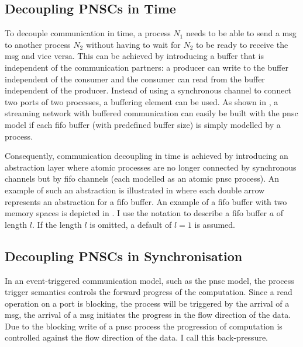 \subsection{Decoupling PNSCs in Time}
\label{sect_cci_decoupling_time}
To decouple communication in time, a process $N_1$ needs to be able to send a \gls*{msg} to another process $N_2$ without having to wait for $N_2$ to be ready to receive the \gls*{msg} and vice versa.
This can be achieved by introducing a buffer that is independent of the communication partners: a producer can write to the buffer independent of the consumer and the consumer can read from the buffer independent of the producer.
Instead of using a synchronous channel to connect two ports of two processes, a buffering element can be used.
As shown in \Sect{\ref{sect_ecm_example_stream}}, a streaming network with buffered communication can easily be built with the \gls{pnsc} model if each \gls{fifo} buffer (with predefined buffer size) is simply modelled by a process.

Consequently, communication decoupling in time is achieved by introducing an abstraction layer where atomic processes are no longer connected by synchronous channels but by \gls{fifo} channels (each modelled as an atomic \gls{pnsc} process).
An example of such an abstraction is illustrated in \Fig{\ref{fig_cross_procs_dl}} where each double arrow represents an abstraction for a \gls{fifo} buffer.
An example of a \gls{fifo} buffer with two memory spaces is depicted in \Fig{\ref{fig_sia_fifo}}.
I use the notation  to describe a \gls{fifo} buffer $a$ of length $l$.
If the length $l$ is omitted, a default of $l=1$ is assumed.

\subsection{Decoupling PNSCs in Synchronisation}
\label{sect_cci_decoupling_sync}
In an event-triggered communication model, such as the \gls{pnsc} model, the process trigger semantics controls the forward progress of the computation.
Since a read operation on a port is blocking, the process will be triggered by the arrival of a \gls*{msg}, \ie the arrival of a \gls*{msg} initiates the progress in the flow direction of the data.
Due to the blocking write of a \gls{pnsc} process the progression of computation is controlled against the flow direction of the data.
I call this back-pressure.

